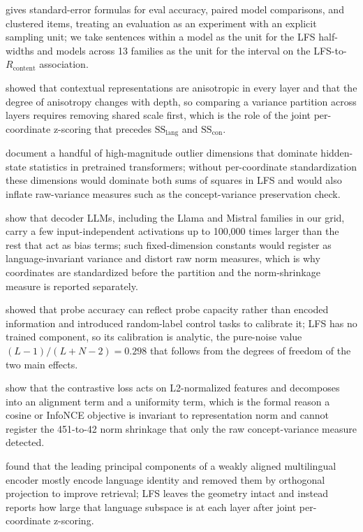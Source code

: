 \documentclass[11pt,a4paper]{article}
\begin{document}
\citet{miller2024evals} gives standard-error formulas for eval accuracy, paired model comparisons, and clustered items, treating an evaluation as an experiment with an explicit sampling unit; we take sentences within a model as the unit for the LFS half-widths and models across 13 families as the unit for the interval on the LFS-to-$R_{\mathrm{content}}$ association.

\citet{ethayarajh2019contextual} showed that contextual representations are anisotropic in every layer and that the degree of anisotropy changes with depth, so comparing a variance partition across layers requires removing shared scale first, which is the role of the joint per-coordinate z-scoring that precedes $\mathrm{SS}_{\mathrm{lang}}$ and $\mathrm{SS}_{\mathrm{con}}$.

\citet{kovaleva2021outlier} document a handful of high-magnitude outlier dimensions that dominate hidden-state statistics in pretrained transformers; without per-coordinate standardization these dimensions would dominate both sums of squares in LFS and would also inflate raw-variance measures such as the concept-variance preservation check.

\citet{sun2024massive} show that decoder LLMs, including the Llama and Mistral families in our grid, carry a few input-independent activations up to 100,000 times larger than the rest that act as bias terms; such fixed-dimension constants would register as language-invariant variance and distort raw norm measures, which is why coordinates are standardized before the partition and the norm-shrinkage measure is reported separately.

\citet{hewitt2019control} showed that probe accuracy can reflect probe capacity rather than encoded information and introduced random-label control tasks to calibrate it; LFS has no trained component, so its calibration is analytic, the pure-noise value $(L-1)/(L+N-2)=0.298$ that follows from the degrees of freedom of the two main effects.

\citet{wang2020uniformity} show that the contrastive loss acts on L2-normalized features and decomposes into an alignment term and a uniformity term, which is the formal reason a cosine or InfoNCE objective is invariant to representation norm and cannot register the 451-to-42 norm shrinkage that only the raw concept-variance measure detected.

\citet{yang2021bias} found that the leading principal components of a weakly aligned multilingual encoder mostly encode language identity and removed them by orthogonal projection to improve retrieval; LFS leaves the geometry intact and instead reports how large that language subspace is at each layer after joint per-coordinate z-scoring.
\end{document}
